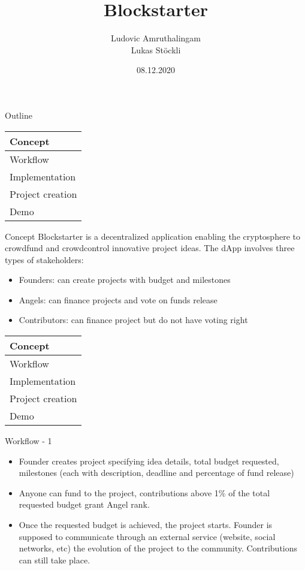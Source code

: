 \documentclass{beamer}
\title              {Blockstarter}
\author             {Ludovic Amruthalingam\\Lukas Stöckli}
\institute          {University of Basel}
\date               {08.12.2020}
\begin{document}
\begin{frame}[t,plain]
	\titlepage
\end{frame}




\begin{frame}{Outline}
	\begin{tabularx}{\textwidth}{X}
		\hline
		\rowcolor{hcolor}
		Concept\\
		\hline
		Workflow\\
		\hline
		Implementation\\
		\hline
		Project creation\\
		\hline
		Demo\\
		\hline
	\end{tabularx}
\end{frame}




\begin{frame}{Concept}
Blockstarter is a decentralized application enabling the cryptosphere to crowdfund and crowdcontrol innovative project ideas. The dApp involves three types of stakeholders:
\begin{itemize}
	\item Founders: can create projects with budget and milestones
	\item Angels: can finance projects and vote on funds release
	\item Contributors: can finance project but do not have voting right
\end{itemize}
\end{frame}

\begin{frame}
	\begin{tabularx}{\textwidth}{X}
		\hline
		Concept\\
		\hline
		\rowcolor{hcolor}
		Workflow\\
		\hline
		Implementation\\
		\hline
		Project creation\\
		\hline
		Demo\\
		\hline
	\end{tabularx}
\end{frame}

\begin{frame}{Workflow - 1}
\begin{itemize}
	\item Founder creates project specifying idea details, total budget requested, milestones (each with description, deadline and percentage of fund release)
	\item Anyone can fund to the project, contributions above 1\% of the total requested budget grant Angel rank.
	\item Once the requested budget is achieved, the project starts. Founder is supposed to communicate through an external service (website, social networks, etc) the evolution of the project to the community. Contributions can still take place.
\end{itemize}
\end{frame}
\end{document}
